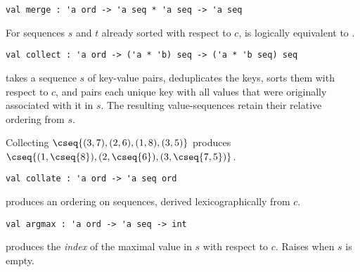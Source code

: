 \begin{cluster}
\label{grp:gr:merge}

\begin{gram}[merge]
\label{gr:merge}
\begin{verbatim}
val merge : 'a ord -> 'a seq * 'a seq -> 'a seq
\end{verbatim}
For sequences $s$ and $t$ already sorted with respect to $c$,
 is logically equivalent to .

\end{gram}
\end{cluster}

\begin{flex}
\label{grp:grm:seq-interface::collect}

\begin{gram}
\label{grm:seq-interface::collect}
\begin{gram}[collect]
\label{gr:collect}
\begin{verbatim}
val collect : 'a ord -> ('a * 'b) seq -> ('a * 'b seq) seq
\end{verbatim}
 takes a sequence $s$ of key-value pairs, deduplicates the
keys, sorts them with respect to $c$, and pairs each unique key with all values
that were originally associated with it in $s$. The resulting value-sequences
retain their relative ordering from $s$.
\end{gram}
\begin{example}
Collecting $\cseq{(3,7),(2,6),(1,8),(3,5)}$ produces
$\cseq{(1,\cseq{8}), (2, \cseq{6}), (3,\cseq{7,5})}$.
\end{example}

\end{gram}
\end{flex}

\begin{cluster}
\label{grp:gr:collate}

\begin{gram}[collate]
\label{gr:collate}
\begin{verbatim}
val collate : 'a ord -> 'a seq ord
\end{verbatim}
 produces an ordering on sequences, derived lexicographically
from $c$.

\end{gram}
\end{cluster}

\begin{cluster}
\label{grp:gr:argmax}

\begin{gram}[argmax]
\label{gr:argmax}
\begin{verbatim}
val argmax : 'a ord -> 'a seq -> int
\end{verbatim}
 produces the \emph{index} of the maximal value in $s$
with respect to $c$. Raises  when $s$ is empty.

\end{gram}
\end{cluster}

